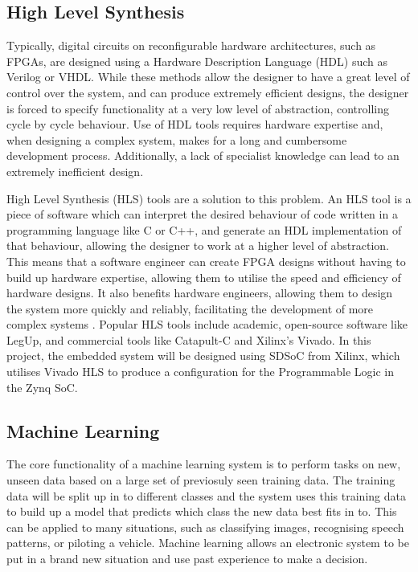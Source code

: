 \documentclass[12pt]{article}
\begin{document}
\subsection{High Level Synthesis}
\label{sec:Background-HLS}

Typically, digital circuits on reconfigurable hardware architectures, such as FPGAs, are designed using a Hardware Description Language (HDL) such as Verilog or VHDL. While these methods allow the designer to have a great level of control over the system, and can produce extremely efficient designs, the designer is forced to specify functionality at a very low level of abstraction, controlling cycle by cycle behaviour. Use of HDL tools requires hardware expertise and, when designing a complex system, makes for a long and cumbersome development process. Additionally, a lack of specialist knowledge can lead to an extremely inefficient design.

High Level Synthesis (HLS) tools are a  solution to this problem. An HLS tool is a piece of software which can interpret the desired behaviour of code written in a programming language like C or C++, and generate an HDL implementation of that behaviour, allowing the designer to work at a higher level of abstraction. This means that a software engineer can create FPGA designs without having to build up hardware expertise, allowing them to utilise the speed and efficiency of hardware designs. It also benefits hardware engineers, allowing them to design the system more quickly and reliably, facilitating the development of more complex systems \cite{HLS}. Popular HLS tools include academic, open-source software like LegUp, and commercial tools like Catapult-C and Xilinx's Vivado. In this project, the embedded system will be designed using SDSoC from Xilinx, which utilises Vivado HLS to produce a configuration for the Programmable Logic in the Zynq SoC.

\subsection{Machine Learning}
\label{sec:Background-ML}

The core functionality of a machine learning system is to perform tasks on new, unseen data based on a large set of previosuly seen training data. The training data will be split up in to different classes and the system uses this training data to build up a model that predicts which class the new data best fits in to. This can be applied to many situations, such as classifying images, recognising speech patterns, or piloting a vehicle. Machine learning allows an electronic system to be put in a brand new situation and use past experience to make a decision.
\end{document}
